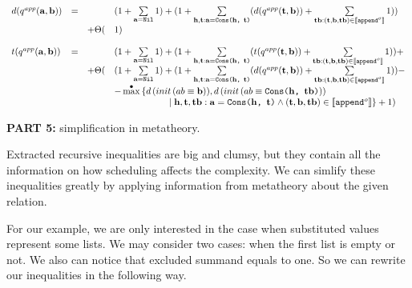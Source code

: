 \[
\begin{array}{lcll}
d(q^{app}(\mathbf{a}, \mathbf{b})) & = & & (1 + \sum\limits_{\mathbf{a} = \texttt{Nil}} 1) + (1 + \sum\limits_{\mathbf{h}, \mathbf{t}: \mathbf{a} = \texttt{Cons($\mathbf{h}$, $\mathbf{t}$)}} (d(q^{app}(\mathbf{t}, \mathbf{b})) + \sum\limits_{\mathbf{tb} : (\mathbf{t}, \mathbf{b}, \mathbf{tb}) \in \llbracket \texttt{append$^o$} \rrbracket} 1)) \\
& & + \Theta( & 1) \\
\\
t(q^{app}(\mathbf{a}, \mathbf{b})) & = & & (1 + \sum\limits_{\mathbf{a} = \texttt{Nil}} 1) + (1 + \sum\limits_{\mathbf{h}, \mathbf{t}: \mathbf{a} = \texttt{Cons($\mathbf{h}$, $\mathbf{t}$)}} (t(q^{app}(\mathbf{t}, \mathbf{b})) + \sum\limits_{\mathbf{tb} : (\mathbf{t}, \mathbf{b}, \mathbf{tb}) \in \llbracket \texttt{append$^o$} \rrbracket} 1)) + \\
& & + \Theta( & (1 + \sum\limits_{\mathbf{a} = \texttt{Nil}} 1) + (1 + \sum\limits_{\mathbf{h}, \mathbf{t}: \mathbf{a} = \texttt{Cons($\mathbf{h}$, $\mathbf{t}$)}} (d(q^{app}(\mathbf{t}, \mathbf{b})) + \sum\limits_{\mathbf{tb} : (\mathbf{t}, \mathbf{b}, \mathbf{tb}) \in \llbracket \texttt{append$^o$} \rrbracket} 1)) - \\
& & &  - \max^{\bullet}\limits{} \{ d\,(init\,(ab \equiv \mathbf{b})), d\,(init\,(ab \equiv \texttt{Cons($\mathbf{h}$, $\mathbf{tb}$)})) \\
& & & \qquad \qquad  \qquad  \mid \mathbf{h}, \mathbf{t}, \mathbf{tb}: \mathbf{a} = \texttt{Cons($\mathbf{h}$, $\mathbf{t}$)} \land (\mathbf{t}, \mathbf{b}, \mathbf{tb}) \in \llbracket \texttt{append$^o$} \rrbracket \} + 1) 
\end{array}
\]








\colorbox{blue!20}{\parbox{\textwidth}{\textbf{PART 5:} simplification in metatheory.}}

Extracted recursive inequalities are big and clumsy, but they contain all the information on how scheduling affects the complexity. We can simlify these inequalities greatly by applying information from metatheory about the given relation.

For our example, we are only interested in the case when substituted values represent some lists. We may consider two cases: when the first list is empty or not. We also can notice that excluded summand equals to one. So we can rewrite our inequalities in the following way.

